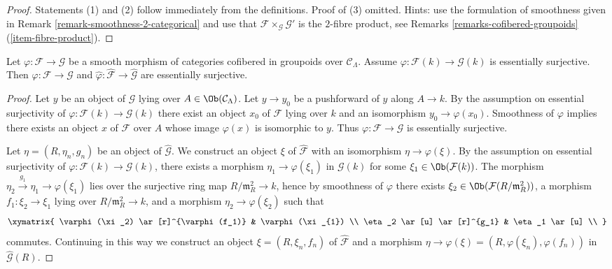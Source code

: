 \begin{proof}
Statements (1) and (2) follow immediately from the definitions.
Proof of (3) omitted. Hints: use the formulation of smoothness given in
Remark \ref{remark-smoothness-2-categorical}
and use that $\mathcal{F} \times_\mathcal{G} \mathcal{G}'$
is the $2$-fibre product, see
Remarks \ref{remarks-cofibered-groupoids} (\ref{item-fibre-product}).
\end{proof}

\begin{lemma}
\label{lemma-smooth-morphism-essentially-surjective}
Let $\varphi: \mathcal{F} \to \mathcal{G}$ be a smooth morphism of
categories cofibered in groupoids over $\mathcal{C}_\Lambda$.  Assume
$\varphi : \mathcal{F}(k) \to \mathcal{G}(k)$ is essentially surjective.
Then $\varphi : \mathcal{F} \to \mathcal{G}$ and
$\widehat{\varphi} : \widehat{\mathcal{F}} \to \widehat{\mathcal{G}}$
are essentially surjective.
\end{lemma}

\begin{proof}
Let $y$ be an object of $\mathcal{G}$ lying over
$A \in \Ob(\mathcal{C}_\Lambda)$. Let $y \to y_0$ be a pushforward
of $y$ along $A \to k$. By the assumption on essential surjectivity of
$\varphi: \mathcal{F}(k) \to \mathcal{G}(k)$ there exist an object
$x_0$ of $\mathcal{F}$ lying over $k$ and an isomorphism
$y_0 \to \varphi(x_0)$. Smoothness of $\varphi$ implies there exists
an object $x$ of $\mathcal{F}$ over $A$ whose image $\varphi(x)$
is isomorphic to $y$. Thus $\varphi : \mathcal{F} \to \mathcal{G}$
is essentially surjective.

\medskip\noindent
Let $\eta = (R, \eta_n, g_n)$ be an object of $\widehat{\mathcal{G}}$.  We
construct an object $\xi$ of $\widehat{\mathcal{F}}$ with an isomorphism
$\eta \to \varphi(\xi)$. By the assumption on essential surjectivity of
$\varphi : \mathcal{F}(k) \to \mathcal{G}(k)$, there exists a morphism
$\eta_1 \to \varphi(\xi_1)$ in $\mathcal{G}(k)$ for some
$\xi_1 \in \Ob(\mathcal{F}(k))$. The morphism
$\eta_2 \xrightarrow{g_1} \eta_1 \to \varphi(\xi_1)$
lies over the surjective ring map $R/\mathfrak m_R^2 \to k$, hence
by smoothness of $\varphi$ there exists
$\xi_2 \in \Ob(\mathcal{F}(R/\mathfrak m_R^2))$, a
morphism $f_1: \xi_2 \to \xi_1$ lying over
$R/\mathfrak m_R^2 \to k$, and a morphism
$\eta_2 \to \varphi(\xi_2)$ such that
$$
\xymatrix{
\varphi(\xi_2)  \ar[r]^{\varphi(f_1)} &  \varphi(\xi_{1})   \\
\eta_2   \ar[u] \ar[r]^{g_1}  & \eta_1  \ar[u] \\
}
$$
commutes. Continuing in this way we construct an object
$\xi = (R, \xi_n, f_n)$ of $\widehat{\mathcal{F}}$ and a morphism
$\eta \to \varphi(\xi) = (R, \varphi(\xi_n), \varphi(f_n))$
in $\widehat{\mathcal{G}}(R)$.
\end{proof}

